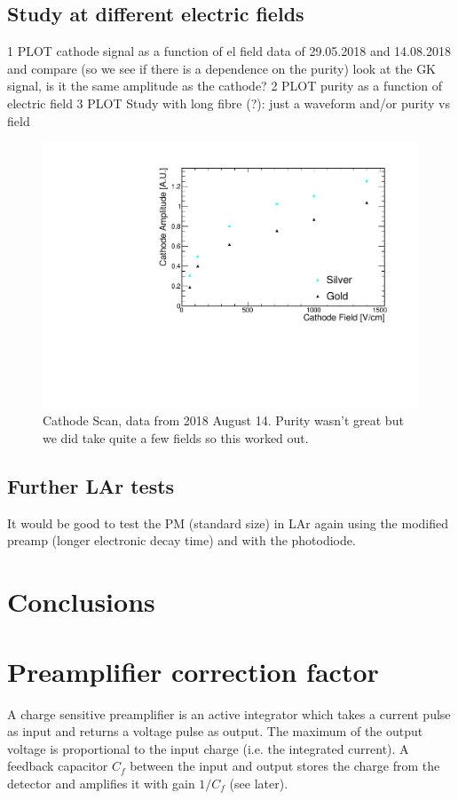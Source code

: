 \documentclass[a4paper,11pt]{article}
\begin{document}
\subsection{Study at different electric fields}
1 PLOT cathode signal as a function of el field
data of 29.05.2018 and 14.08.2018 and compare (so we see if there is a dependence on the purity)
look at the GK signal, is it the same amplitude as the cathode?
2 PLOT purity as a function of electric field 
3 PLOT Study with long fibre (?): just a waveform and/or purity vs field 

\begin{figure}
    \centering
    \includegraphics[width=.7\linewidth]{figures/CathodeScan2018Aug14_ShortFibre_SilverGold.pdf}
    \caption{Cathode Scan, data from 2018 August 14. Purity wasn't great but we did take quite a few fields so this worked out.}
    \label{fig:cathodeScan}
\end{figure}

\subsection{Further LAr tests}
It would be good to test the PM (standard size) in LAr again using the modified preamp (longer electronic decay time) and with the photodiode. 

\section{Conclusions}

\appendix

\section{Preamplifier correction factor}
A charge sensitive preamplifier is an active integrator which takes a current pulse as input and returns a voltage pulse as output. The maximum of the output voltage is proportional to the input charge (i.e. the integrated current). A feedback capacitor $C_f$ between the input and output stores the charge from the detector and amplifies it with gain $1/C_f$ (see later). 
\end{document}

